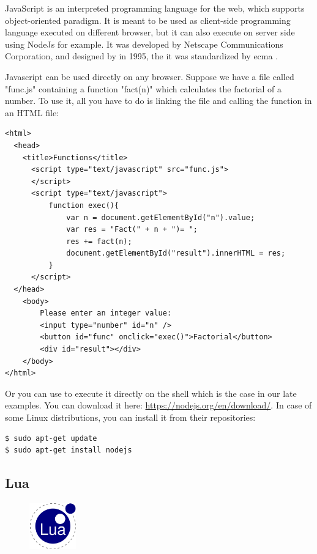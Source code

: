 \documentclass{KodeBook}
\begin{document}
JavaScript is an interpreted programming language for the web, which supports object-oriented paradigm. 
It is meant to be used as client-side programming language executed on different browser, but it can also execute on server side using NodeJs for example.
It was developed by Netscape Communications Corporation, and designed by  in 1995, the it was standardized by \ac{ecma} \citep{2018-rubens}. 


Javascript can be used directly on any browser. 
Suppose we have a file called "func.js" containing a function "fact(n)" which calculates the factorial of a number. 
To use it, all you have to do is linking the file and calling the function in an HTML file:
\begin{lstlisting}[language={[KB]Javascript}, style=codeStyle]
<html>
  <head>
    <title>Functions</title>
      <script type="text/javascript" src="func.js">
      </script>
      <script type="text/javascript">
          function exec(){
              var n = document.getElementById("n").value;
              var res = "Fact(" + n + ")= ";
              res += fact(n);
              document.getElementById("result").innerHTML = res;
          }
      </script>
  </head>
    <body>
        Please enter an integer value: 
        <input type="number" id="n" />
        <button id="func" onclick="exec()">Factorial</button>
        <div id="result"></div>
    </body>
</html>
\end{lstlisting}


Or you can use  to execute it directly on the shell which is the case in our late examples. 
You can download it here: \url{https://nodejs.org/en/download/}. 
In case of some Linux distributions, you can install it from their repositories:
\begin{lstlisting}[style=shellStyle]
$ sudo apt-get update
$ sudo apt-get install nodejs
\end{lstlisting}

\subsection{Lua}

\begin{figure}
	\centering
	\vspace{-20pt}
	\includegraphics[width=2cm]{../img/Lua.pdf}
	\vspace{-20pt}
\end{figure}
\end{document}
